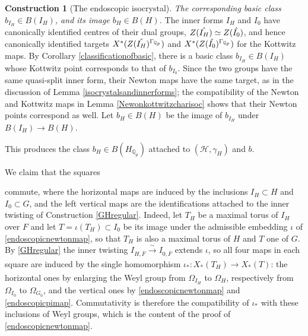 \documentclass[11pt,a4paper]{article}
\theoremstyle{definition}
\newtheorem{const}[shared]{Construction}
\theoremstyle{plain}
\theoremstyle{remark}
\theoremstyle{plain}
\begin{document}
\begin{const}[The endoscopic isocrystal]
\textit{The corresponding basic class $b_{I_H}\in B(I_H)$, and its image $b_H\in B(H)$.} The inner forms $I_H$ and $I_0$ have canonically identified centres of their dual groups, $Z(\Hat{I_H})\simeq Z(\Hat{I_0})$, and hence canonically identified targets $X^*(Z(\Hat{I_H})^{\Gamma_{\mathbb{Q}_p}})$ and $X^*(Z(\Hat{I_0})^{\Gamma_{\mathbb{Q}_p}})$ for the Kottwitz maps. By Corollary \ref{classificationofbasic}, there is a basic class $b_{I_H}\in B(I_H)$ whose Kottwitz point corresponds to that of $b_{I_0}$. Since the two groups have the same quasi-split inner form, their Newton maps have the same target, as in the discussion of Lemma \ref{isocrystalsandinnerforms}; the compatibility of the Newton and Kottwitz maps in Lemma \ref{Newonkottwitzcharisoc} shows that their Newton points correspond as well. Let $b_H\in B(H)$ be the image of $b_{I_H}$ under $B(I_H)\to B(H)$.

This produces the class $b_H\in B(H_{\mathbb{Q}_p})$ attached to $(\mathcal H,\gamma_H)$ and $b$.
\end{const}

We claim that the squares
\begin{center}
\end{center}
commute, where the horizontal maps are induced by the inclusions $I_H \subset H$ and $I_0 \subset G$, and the left vertical maps are the identifications attached to the inner twisting of Construction \ref{GHregular}. Indeed, let $T_H$ be a maximal torus of $I_H$ over $F$ and let $T = \iota(T_H) \subset I_0$ be its image under the admissible embedding $\iota$ of \ref{endoscopicnewtonmap}, so that $T_H$ is also a maximal torus of $H$ and $T$ one of $G$. By \ref{GHregular} the inner twisting $I_{H,\overline{F}} \xrightarrow[]{\sim} I_{0,\overline{F}}$ extends $\iota$, so all four maps in each square are induced by the single homomorphism $\iota_*: X_*(T_H) \xrightarrow[]{} X_*(T)$: the horizontal ones by enlarging the Weyl group from $\Omega_{I_H}$ to $\Omega_H$, respectively from $\Omega_{I_0}$ to $\Omega_{G_0}$, and the vertical ones by \ref{endoscopicnewtonmap} and \ref{endoscopicpimap}. Commutativity is therefore the compatibility of $\iota_*$ with these inclusions of Weyl groups, which is the content of the proof of \ref{endoscopicnewtonmap}.
\end{document}
